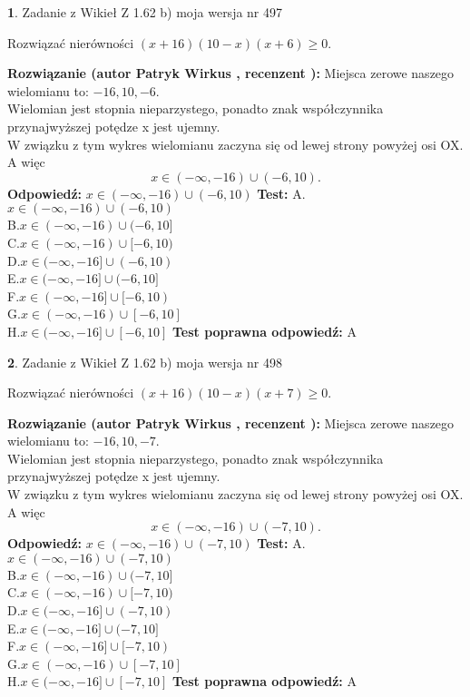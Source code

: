 \documentclass[12pt, a4paper]{article}
\theoremstyle{definition} %
\newtheorem{zad}{}
\newcommand{\zadStart}[1]{\begin{zad}#1\newline}
\newcommand{\zadStop}{\end{zad}}
\newcommand{\rozwStart}[2]{\noindent \textbf{Rozwiązanie (autor #1 , recenzent #2): }\newline}
\newcommand{\rozwStop}{\newline}
\newcommand{\odpStart}{\noindent \textbf{Odpowiedź:}\newline}
\newcommand{\odpStop}{\newline}
\newcommand{\testStart}{\noindent \textbf{Test:}\newline}
\newcommand{\testStop}{\newline}
\newcommand{\kluczStart}{\noindent \textbf{Test poprawna odpowiedź:}\newline}
\newcommand{\kluczStop}{\newline}
\begin{document}
\zadStart{Zadanie z Wikieł Z 1.62 b) moja wersja nr 497}

Rozwiązać nierówności $(x+16)(10-x)(x+6)\ge0$.
\zadStop
\rozwStart{Patryk Wirkus}{}
Miejsca zerowe naszego wielomianu to: $-16, 10, -6$.\\
Wielomian jest stopnia nieparzystego, ponadto znak współczynnika przy\linebreak najwyższej potędze x jest ujemny.\\ W związku z tym wykres wielomianu zaczyna się od lewej strony powyżej osi OX. A więc $$x \in (-\infty,-16) \cup (-6,10).$$
\rozwStop
\odpStart
$x \in (-\infty,-16) \cup (-6,10)$
\odpStop
\testStart
A.$x \in (-\infty,-16) \cup (-6,10)$\\
B.$x \in (-\infty,-16) \cup (-6,10]$\\
C.$x \in (-\infty,-16) \cup [-6,10)$\\
D.$x \in (-\infty,-16] \cup (-6,10)$\\
E.$x \in (-\infty,-16] \cup (-6,10]$\\
F.$x \in (-\infty,-16] \cup [-6,10)$\\
G.$x \in (-\infty,-16) \cup [-6,10]$\\
H.$x \in (-\infty,-16] \cup [-6,10]$
\testStop
\kluczStart
A
\kluczStop



\zadStart{Zadanie z Wikieł Z 1.62 b) moja wersja nr 498}

Rozwiązać nierówności $(x+16)(10-x)(x+7)\ge0$.
\zadStop
\rozwStart{Patryk Wirkus}{}
Miejsca zerowe naszego wielomianu to: $-16, 10, -7$.\\
Wielomian jest stopnia nieparzystego, ponadto znak współczynnika przy\linebreak najwyższej potędze x jest ujemny.\\ W związku z tym wykres wielomianu zaczyna się od lewej strony powyżej osi OX. A więc $$x \in (-\infty,-16) \cup (-7,10).$$
\rozwStop
\odpStart
$x \in (-\infty,-16) \cup (-7,10)$
\odpStop
\testStart
A.$x \in (-\infty,-16) \cup (-7,10)$\\
B.$x \in (-\infty,-16) \cup (-7,10]$\\
C.$x \in (-\infty,-16) \cup [-7,10)$\\
D.$x \in (-\infty,-16] \cup (-7,10)$\\
E.$x \in (-\infty,-16] \cup (-7,10]$\\
F.$x \in (-\infty,-16] \cup [-7,10)$\\
G.$x \in (-\infty,-16) \cup [-7,10]$\\
H.$x \in (-\infty,-16] \cup [-7,10]$
\testStop
\kluczStart
A
\kluczStop
\end{document}
